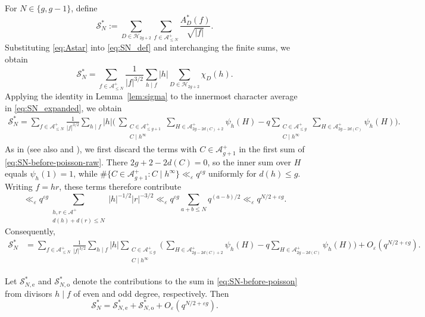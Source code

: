\documentclass[a4paper,reqno]{amsart}
\numberwithin{equation}{section}
\theoremstyle{remark}
\theoremstyle{definition}
\newcommand{\A}{\mathcal{A}}
\begin{document}
For $N\in\{g,g-1\}$, define
\begin{equation}\label{eq:SN_def}
\mathcal S_N^*
:=
\sum_{D\in\mathcal H_{2g+2}}
\sum_{f\in\A_{\le N}^+}
\frac{A_D^*(f)}{\sqrt{|f|}}.
\end{equation}
Substituting \eqref{eq:Astar} into \eqref{eq:SN_def} and interchanging the
finite sums, we obtain
\begin{equation}\label{eq:SN_expanded}
\mathcal S_N^*
=
\sum_{f\in\A_{\le N}^+}
\frac{1}{|f|^{3/2}}
\sum_{h\mid f}|h|
\sum_{D\in\mathcal H_{2g+2}}\chi_D(h).
\end{equation}
Applying the identity in Lemma~\ref{lem:sigma} to the innermost character
average in \eqref{eq:SN_expanded}, we obtain
\begin{align}\label{eq:SN-before-poisson-raw}
\mathcal S_N^*
=
\sum_{f\in\A_{\le N}^+}
\frac{1}{|f|^{3/2}}
\sum_{h\mid f}|h|
\Biggl(\, \sum_{\substack{C\in\A_{\le g+1}^+\\C\mid h^\infty}}
\sum_{H\in\A_{2g-2d(C)+2}^+}\psi_h(H) -q   \sum_{\substack{C\in\A_{\le g}^+\\C\mid h^\infty}}
\sum_{H\in\A_{2g-2d(C)}^+}\psi_h(H) \Biggr).
\end{align}
As in \cite[Section~4]{Fl17-1} (see also \cite[(3.2)]{Ju20} and
\cite[Section~3]{AM-21}), we first discard the terms with $C\in\A_{g+1}^+$
in the first sum of \eqref{eq:SN-before-poisson-raw}. There $2g+2-2d(C)=0$,
so the inner sum over $H$ equals $\psi_h(1)=1$, while
$\#\bigl\{C\in\A_{g+1}^+:C\mid h^\infty\bigr\}\ll_\varepsilon q^{\varepsilon g}$
uniformly for $d(h)\le g$. Writing $f=hr$, these terms therefore contribute
$$
\ll_\varepsilon
q^{\varepsilon g}
\sum_{\substack{h,r\in\A^+\\d(h)+d(r)\le N}}|h|^{-1/2}|r|^{-3/2}
\ll_\varepsilon
q^{\varepsilon g}\sum_{a+b\le N}q^{(a-b)/2}
\ll_\varepsilon
q^{N/2+\varepsilon g}.
$$
Consequently, 
\begin{align}\label{eq:SN-before-poisson}
\mathcal S_N^*
&=
\sum_{f\in\A_{\le N}^+}
\frac{1}{|f|^{3/2}}
\sum_{h\mid f}|h|
\sum_{\substack{C\in\A_{\le g}^+\\C\mid h^\infty}}
\Biggl(
\,\sum_{H\in\A_{2g-2d(C)+2}^+}\psi_h(H)
-q\sum_{H\in\A_{2g-2d(C)}^+}\psi_h(H)
\Biggr)
+O_\varepsilon\!\left(q^{N/2+\varepsilon g}\right).
\end{align}

Let $\mathcal S_{N,\mathrm e}^*$ and $\mathcal S_{N,\mathrm o}^*$ denote the
contributions to the sum in \eqref{eq:SN-before-poisson} from divisors
$h\mid f$ of even and odd degree, respectively. Then
\begin{equation}\label{eq:parity_split}
\mathcal S_N^*
=
\mathcal S_{N,\mathrm e}^*
+
\mathcal S_{N,\mathrm o}^*
+
O_\varepsilon\!\left(q^{N/2+\varepsilon g}\right).
\end{equation}
\end{document}

